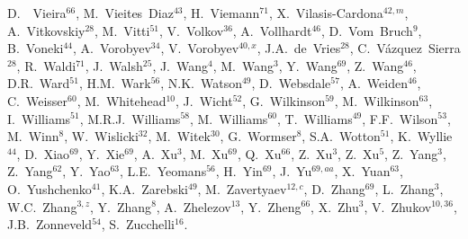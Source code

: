 \begin{flushleft}
D.~~Vieira$^{66}$,
M.~Vieites~Diaz$^{43}$,
H.~Viemann$^{71}$,
X.~Vilasis-Cardona$^{42,m}$,
A.~Vitkovskiy$^{28}$,
M.~Vitti$^{51}$,
V.~Volkov$^{36}$,
A.~Vollhardt$^{46}$,
D.~Vom~Bruch$^{9}$,
B.~Voneki$^{44}$,
A.~Vorobyev$^{34}$,
V.~Vorobyev$^{40,x}$,
J.A.~de~Vries$^{28}$,
C.~V{\'a}zquez~Sierra$^{28}$,
R.~Waldi$^{71}$,
J.~Walsh$^{25}$,
J.~Wang$^{4}$,
M.~Wang$^{3}$,
Y.~Wang$^{69}$,
Z.~Wang$^{46}$,
D.R.~Ward$^{51}$,
H.M.~Wark$^{56}$,
N.K.~Watson$^{49}$,
D.~Websdale$^{57}$,
A.~Weiden$^{46}$,
C.~Weisser$^{60}$,
M.~Whitehead$^{10}$,
J.~Wicht$^{52}$,
G.~Wilkinson$^{59}$,
M.~Wilkinson$^{63}$,
I.~Williams$^{51}$,
M.R.J.~Williams$^{58}$,
M.~Williams$^{60}$,
T.~Williams$^{49}$,
F.F.~Wilson$^{53}$,
M.~Winn$^{8}$,
W.~Wislicki$^{32}$,
M.~Witek$^{30}$,
G.~Wormser$^{8}$,
S.A.~Wotton$^{51}$,
K.~Wyllie$^{44}$,
D.~Xiao$^{69}$,
Y.~Xie$^{69}$,
A.~Xu$^{3}$,
M.~Xu$^{69}$,
Q.~Xu$^{66}$,
Z.~Xu$^{3}$,
Z.~Xu$^{5}$,
Z.~Yang$^{3}$,
Z.~Yang$^{62}$,
Y.~Yao$^{63}$,
L.E.~Yeomans$^{56}$,
H.~Yin$^{69}$,
J.~Yu$^{69,aa}$,
X.~Yuan$^{63}$,
O.~Yushchenko$^{41}$,
K.A.~Zarebski$^{49}$,
M.~Zavertyaev$^{12,c}$,
D.~Zhang$^{69}$,
L.~Zhang$^{3}$,
W.C.~Zhang$^{3,z}$,
Y.~Zhang$^{8}$,
A.~Zhelezov$^{13}$,
Y.~Zheng$^{66}$,
X.~Zhu$^{3}$,
V.~Zhukov$^{10,36}$,
J.B.~Zonneveld$^{54}$,
S.~Zucchelli$^{16}$.\bigskip


\end{flushleft}
